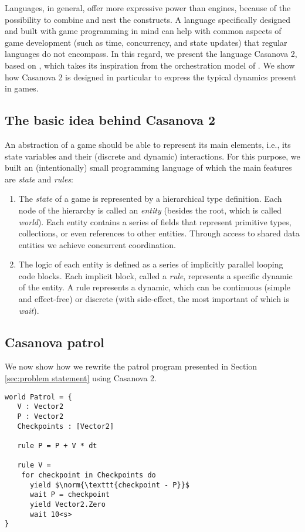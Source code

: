 Languages, in general, offer more expressive power than engines, because of the possibility to combine and nest the constructs. A language specifically designed and built with game programming in mind can help with common aspects of game development (such as time, concurrency, and state updates) that regular languages do not encompass.
In this regard, we present the language Casanova 2, based on \cite{maggiore2012designing}, which takes its inspiration from the orchestration model of \cite{misra2007computation}. We show how Casanova 2 is designed in particular to express the typical dynamics present in games.

\subsection{The basic idea behind Casanova 2}
An abstraction of a game should be able to represent its main elements, i.e., its state variables and their (discrete and dynamic) interactions.
For this purpose, we built an (intentionally) small programming language of which the main features are \textit{state} and \textit{rules}:
\begin{enumerate}[\itshape(i)]
\item The \textit{state} of a game is represented by a hierarchical type definition. Each node of the hierarchy is called an \textit{entity} (besides the root, which is called \textit{world}). Each entity contains a series of fields that represent primitive types, collections, or even references to other entities. Through access to shared data entities we achieve concurrent coordination.
\item The logic of each entity is defined as a series of implicitly parallel looping code blocks. Each implicit block, called a \textit{rule}, represents a specific dynamic of the entity. A rule represents a dynamic, which can be continuous (simple and effect-free) or discrete (with side-effect, the most important of which is \textit{wait}).
\end{enumerate}
\subsection{Casanova patrol}
We now show how we rewrite the patrol program presented in Section \ref{sec:problem statement} using Casanova 2.
\begin{lstlisting}[caption=Patrol in Casanova 2]
world Patrol = {
   V : Vector2
   P : Vector2
   Checkpoints : [Vector2]

   rule P = P + V * dt

   rule V =
    for checkpoint in Checkpoints do
      yield $\norm{\texttt{checkpoint - P}}$
      wait P = checkpoint
      yield Vector2.Zero
      wait 10<s>
}
\end{lstlisting}

